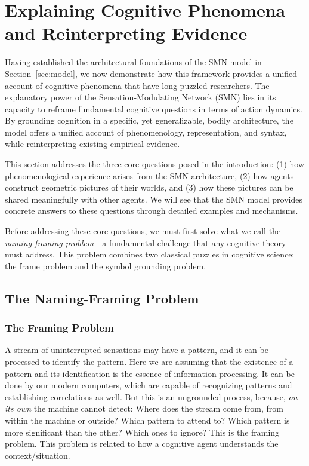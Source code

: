 \section{Explaining Cognitive Phenomena and Reinterpreting Evidence}
\label{sec:phenomena}
Having established the architectural foundations of the SMN model in Section~\ref{sec:model}, we now demonstrate how this framework provides a unified account of cognitive phenomena that have long puzzled researchers. The explanatory power of the Sensation-Modulating Network (SMN) lies in its capacity to reframe fundamental cognitive questions in terms of action dynamics. By grounding cognition in a specific, yet generalizable, bodily architecture, the model offers a unified account of phenomenology, representation, and syntax, while reinterpreting existing empirical evidence.

This section addresses the three core questions posed in the introduction: (1) how phenomenological experience arises from the SMN architecture, (2) how agents construct geometric pictures of their worlds, and (3) how these pictures can be shared meaningfully with other agents. We will see that the SMN model provides concrete answers to these questions through detailed examples and mechanisms.

Before addressing these core questions, we must first solve what we call the \textit{naming-framing problem}—a fundamental challenge that any cognitive theory must address. This problem combines two classical puzzles in cognitive science: the frame problem and the symbol grounding problem.

\subsection{The Naming-Framing Problem}
\label{subsec:naming_framing}

\subsubsection{The Framing Problem}
A stream of uninterrupted sensations may have a pattern, and it can be processed to identify the pattern. Here we are assuming that the existence of a pattern and its identification is the essence of information processing. It can be done by our modern computers, which are capable of recognizing patterns and establishing correlations as well. But this is an ungrounded process, because, \textit{on its own} the machine cannot detect: Where does the stream come from, from within the machine or outside? Which pattern to attend to? Which pattern is more significant than the other? Which ones to ignore? This is the framing problem. This problem is related to how a cognitive agent understands the context/situation.

